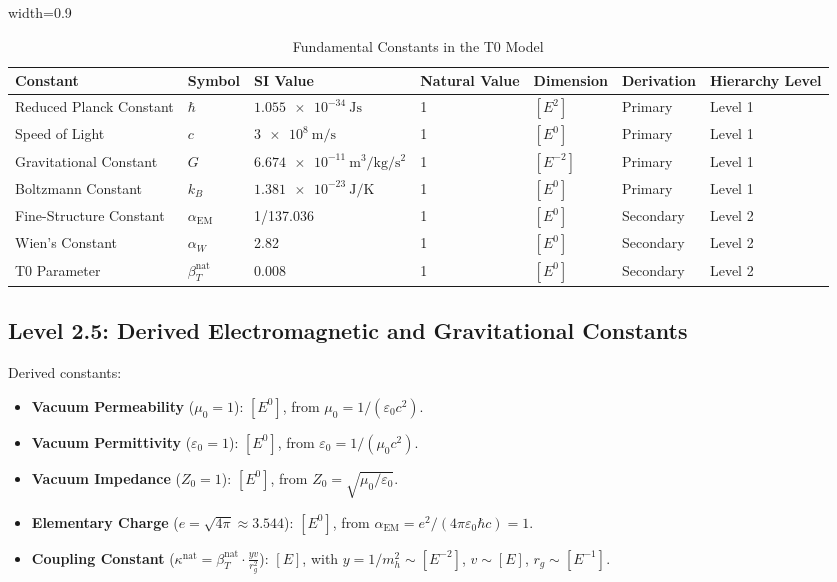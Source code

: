 \documentclass[12pt,a4paper]{article}
\newcommand{\tablescale}{0.9}
\begin{document}
	\begin{table}[htbp]
		\centering
		\begin{adjustbox}{width=\tablescale\textwidth}
			\begin{tabular}{lllllll}
				\toprule
				\textbf{Constant} & \textbf{Symbol} & \textbf{SI Value} & \textbf{Natural Value} & \textbf{Dimension} & \textbf{Derivation} & \textbf{Hierarchy Level} \\
				\midrule
				Reduced Planck Constant & \(\hbar\) & \(\SI{1.055e-34}{\joule\second}\) & 1 & \([E^2]\) & Primary & Level 1 \\
				Speed of Light & \(c\) & \(\SI{3e8}{\meter\per\second}\) & 1 & \([E^0]\) & Primary & Level 1 \\
				Gravitational Constant & \(G\) & \(\SI{6.674e-11}{\meter\cubed\per\kilogram\per\second\squared}\) & 1 & \([E^{-2}]\) & Primary & Level 1 \\
				Boltzmann Constant & \(k_B\) & \(\SI{1.381e-23}{\joule\per\kelvin}\) & 1 & \([E^0]\) & Primary & Level 1 \\
				Fine-Structure Constant & \(\alpha_{\text{EM}}\) & 1/137.036 & 1 & \([E^0]\) & Secondary & Level 2 \\
				Wien’s Constant & \(\alpha_W\) & 2.82 & 1 & \([E^0]\) & Secondary & Level 2 \\
				T0 Parameter & \(\beta_T^{\text{nat}}\) & 0.008 & 1 & \([E^0]\) & Secondary & Level 2 \\
				\bottomrule
			\end{tabular}
		\end{adjustbox}
		\caption{Fundamental Constants in the T0 Model}
		\label{tab:fund_const}
	\end{table}
	
	\subsection{Level 2.5: Derived Electromagnetic and Gravitational Constants}
	\label{subsec:level2.5}
	
	Derived constants:
	\begin{itemize}
		\item \textbf{Vacuum Permeability} (\(\mu_0 = 1\)): \([E^0]\), from \(\mu_0 = 1/(\varepsilon_0 c^2)\).
		\item \textbf{Vacuum Permittivity} (\(\varepsilon_0 = 1\)): \([E^0]\), from \(\varepsilon_0 = 1/(\mu_0 c^2)\).
		\item \textbf{Vacuum Impedance} (\(Z_0 = 1\)): \([E^0]\), from \(Z_0 = \sqrt{\mu_0/\varepsilon_0}\).
		\item \textbf{Elementary Charge} (\(e = \sqrt{4\pi} \approx 3.544\)): \([E^0]\), from \(\alpha_{\text{EM}} = e^2/(4\pi \varepsilon_0 \hbar c) = 1\).
		\item \textbf{Coupling Constant} (\(\kappa^{\text{nat}} = \beta_T^{\text{nat}} \cdot \frac{y v}{r_g^2}\)): \([E]\), with \(y = 1/m_h^2 \sim [E^{-2}]\), \(v \sim [E]\), \(r_g \sim [E^{-1}]\).
	\end{itemize}
	
\end{document}
